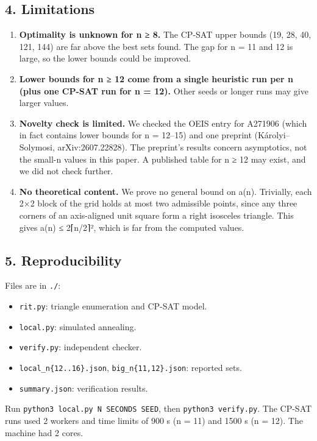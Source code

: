 \documentclass[
  11pt,
]{article}
\providecommand{\tightlist}{%
  \setlength{\itemsep}{0pt}\setlength{\parskip}{0pt}}
\begin{document}
\subsection{4. Limitations}\label{limitations}

\begin{enumerate}
\def\labelenumi{\arabic{enumi}.}
\tightlist
\item
  \textbf{Optimality is unknown for n ≥ 8.} The CP-SAT upper bounds (19,
  28, 40, 121, 144) are far above the best sets found. The gap for n =
  11 and 12 is large, so the lower bounds could be improved.
\item
  \textbf{Lower bounds for n ≥ 12 come from a single heuristic run per n
  (plus one CP-SAT run for n = 12).} Other seeds or longer runs may give
  larger values.
\item
  \textbf{Novelty check is limited.} We checked the OEIS entry for
  A271906 (which in fact contains lower bounds for n = 12--15) and one
  preprint (Károlyi--Solymosi, arXiv:2607.22828). The preprint's results
  concern asymptotics, not the small-n values in this paper. A published
  table for n ≥ 12 may exist, and we did not check further.
\item
  \textbf{No theoretical content.} We prove no general bound on a(n).
  Trivially, each 2×2 block of the grid holds at most two admissible
  points, since any three corners of an axis-aligned unit square form a
  right isosceles triangle. This gives a(n) ≤ 2⌈n/2⌉², which is far from
  the computed values.
\end{enumerate}

\subsection{5. Reproducibility}\label{reproducibility}

Files are in \texttt{./}:

\begin{itemize}
\tightlist
\item
  \texttt{rit.py}: triangle enumeration and CP-SAT model.
\item
  \texttt{local.py}: simulated annealing.
\item
  \texttt{verify.py}: independent checker.
\item
  \texttt{local\_n\{12..16\}.json}, \texttt{big\_n\{11,12\}.json}:
  reported sets.
\item
  \texttt{summary.json}: verification results.
\end{itemize}

Run \texttt{python3\ local.py\ N\ SECONDS\ SEED}, then
\texttt{python3\ verify.py}. The CP-SAT runs used 2 workers and time
limits of 900 s (n = 11) and 1500 s (n = 12). The machine had 2 cores.
\end{document}
